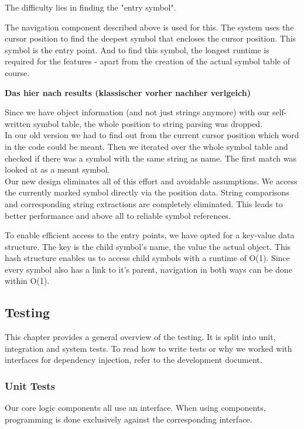 The difficulty lies in finding the "entry symbol".

The navigation component described above is used for this. The system uses the cursor position to find the deepest symbol that encloses the cursor position. This symbol is the entry point. And to find this symbol, the longest runtime is required for the features - apart from the creation of the actual symbol table of course.

\textbf{Das hier nach results (klassischer vorher nachher verlgeich)}

Since we have object information (and not just strings anymore) with our self-written symbol table,
the whole position to string parsing was dropped. \\

In our old version we had to find out from the current cursor position which word in the code could be meant.
Then we iterated over the whole symbol table and checked if there was a symbol with the same string as name.
The first match was looked at as a meant symbol. \\

Our new design eliminates all of this effort and avoidable assumptions.
We access the currently marked symbol directly via the position data.
String comparisons and corresponding string extractions are completely eliminated.
This leads to better performance and above all to reliable symbol references.

To enable efficient access to the entry points, we have opted for a key-value data structure. The key is the child symbol's name, the value the actual  object.
This hash structure enables us to access child symbols with a runtime of O(1). Since every symbol also has a link to it's parent, navigation in both ways can be done within O(1).



\subsection{Testing}

This chapter provides a general overview of the testing. It is split into unit, integration and system tests. To read how to write tests or why we worked with interfaces for dependency injection, refer to the development document.

\subsubsection{Unit Tests}
Our core logic components all use an interface. When using components, programming is done exclusively against the corresponding interface. \\

